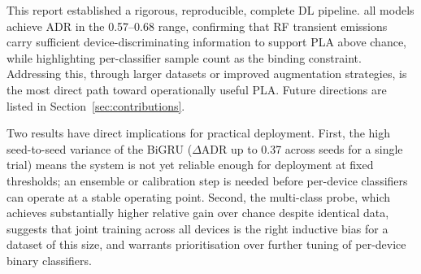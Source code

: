 This report established a rigorous, reproducible, complete DL pipeline.
all models achieve ADR in the 0.57--0.68 range,
confirming that RF transient emissions carry sufficient device-discriminating
information to support PLA above chance, while highlighting per-classifier
sample count as the binding constraint. Addressing this, through larger
datasets or improved augmentation strategies, is the most direct path
toward operationally useful PLA. Future directions are listed in
Section~\ref{sec:contributions}.

Two results have direct implications for practical deployment. First, the
high seed-to-seed variance of the BiGRU ($\Delta$ADR up to 0.37 across seeds
for a single trial) means the system is not yet reliable enough for deployment
at fixed thresholds; an ensemble or calibration step is needed before
per-device classifiers can operate at a stable operating point. Second, the
multi-class probe, which achieves substantially higher relative gain over
chance despite identical data, suggests that joint training across all
devices is the right inductive bias for a dataset of this size, and warrants
prioritisation over further tuning of per-device binary classifiers.
